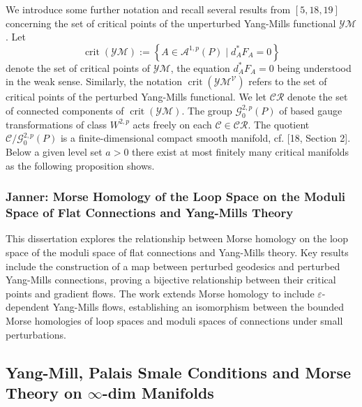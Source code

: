 \documentclass[10pt, letterpaper]{article}
\begin{document}
{\small
We introduce some further notation and recall several results from $[5,18,19]$ concerning the set of critical points of the unperturbed Yang-Mills functional $\mathcal{Y} \mathcal{M}$. Let
$$
\operatorname{crit}(\mathcal{Y} \mathcal{M}):=\left\{A \in \mathcal{A}^{1, p}(P) \mid d_A^* F_A=0\right\}
$$
denote the set of critical points of $\mathcal{Y} \mathcal{M}$, the equation $d_A^* F_A=0$ being understood in the weak sense. Similarly, the notation $\operatorname{crit}\left(\mathcal{Y} \mathcal{M}^{\mathcal{V}}\right)$ refers to the set of critical points of the perturbed Yang-Mills functional. We let $\mathcal{C R}$ denote the set of connected components of $\operatorname{crit}(\mathcal{Y} \mathcal{M})$. The group $\mathcal{G}_0^{2, p}(P)$ of based gauge transformations of class $W^{2, p}$ acts freely on each $\mathcal{C} \in \mathcal{C R}$. The quotient $\mathcal{C} / \mathcal{G}_0^{2, p}(P)$ is a finite-dimensional compact smooth manifold, cf. [18, Section 2]. Below a given level set $a>0$ there exist at most finitely many critical manifolds as the following proposition shows.}


\subsubsection{Janner: Morse Homology of the Loop Space on the Moduli Space of Flat Connections and Yang-Mills Theory \cite{janner2010morse}} 
This dissertation explores the relationship between Morse homology on the loop space of the moduli space of flat connections and Yang-Mills theory. Key results include the construction of a map between perturbed geodesics and perturbed Yang-Mills connections, proving a bijective relationship between their critical points and gradient flows. The work extends Morse homology to include $\varepsilon$-dependent Yang-Mills flows, establishing an isomorphism between the bounded Morse homologies of loop spaces and moduli spaces of connections under small perturbations.




\vspace{1cm}

\subsection{Yang-Mill, Palais Smale Conditions and Morse Theory on $\infty$-dim Manifolds}
\end{document}
